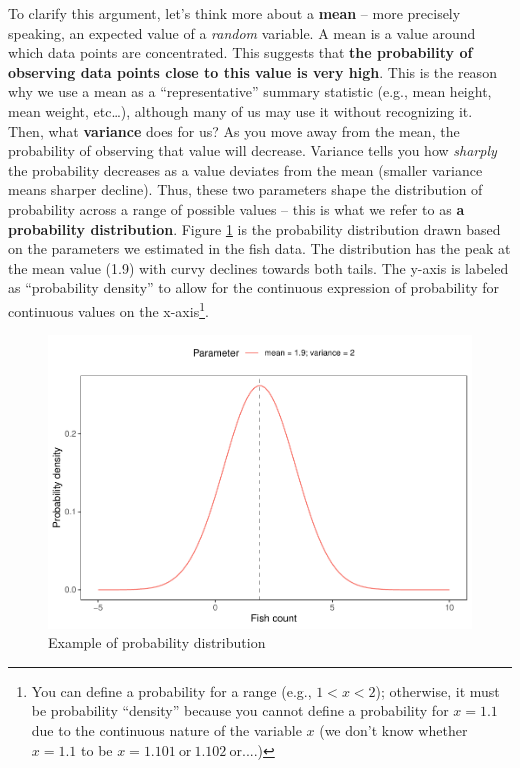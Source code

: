 \documentclass[
]{book}
\begin{document}
To clarify this argument, let's think more about a \textbf{mean} -- more precisely speaking, an expected value of a \emph{random} variable. A mean is a value around which data points are concentrated. This suggests that \textbf{the probability of observing data points close to this value is very high}. This is the reason why we use a mean as a ``representative'' summary statistic (e.g., mean height, mean weight, etc\ldots), although many of us may use it without recognizing it. Then, what \textbf{variance} does for us? As you move away from the mean, the probability of observing that value will decrease. Variance tells you how \emph{sharply} the probability decreases as a value deviates from the mean (smaller variance means sharper decline). Thus, these two parameters shape the distribution of probability across a range of possible values -- this is what we refer to as \textbf{a probability distribution}. Figure \ref{fig:prob-dist} is the probability distribution drawn based on the parameters we estimated in the fish data. The distribution has the peak at the mean value (1.9) with curvy declines towards both tails. The y-axis is labeled as ``probability density'' to allow for the continuous expression of probability for continuous values on the x-axis\footnote{You can define a probability for a range (e.g., \(1 < x < 2\)); otherwise, it must be probability ``density'' because you cannot define a probability for \(x = 1.1\) due to the continuous nature of the variable \(x\) (we don't know whether \(x=1.1\) to be \(x = 1.101~\text{or}~1.102~\text{or}....\))}.

\begin{figure}

{\centering \includegraphics{_main_files/figure-latex/prob-dist-1} 

}

\caption{Example of probability distribution}\label{fig:prob-dist}
\end{figure}
\end{document}
